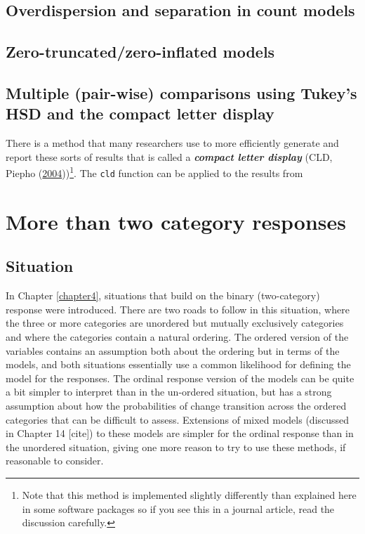 \documentclass[
]{book}
\begin{document}
\hypertarget{section12-6}{%
\section{Overdispersion and separation in count models}\label{section12-6}}

\hypertarget{section12-7}{%
\section{Zero-truncated/zero-inflated models}\label{section12-7}}

\hypertarget{section12-8}{%
\section{Multiple (pair-wise) comparisons using Tukey's HSD and the compact letter display}\label{section12-8}}

\indent There is a method that many researchers use to more efficiently generate and
report these sorts of results that is called a \textbf{\emph{compact letter display}} 
(CLD, Piepho (\protect\hyperlink{ref-Piepho2004}{2004}))\footnote{Note that this method is implemented slightly differently than explained here in some software packages so if you see this in a journal article, read the discussion carefully.}. The \texttt{cld} function can be applied to the results from

\hypertarget{chapter13}{%
\chapter{More than two category responses}\label{chapter13}}

\hypertarget{section13-1}{%
\section{Situation}\label{section13-1}}

In Chapter \ref{chapter4}, situations that build on the binary (two-category) response were introduced. There are two roads to follow in this situation, where the three or more categories are unordered but mutually exclusively categories and where the categories contain a natural ordering. The ordered version of the variables contains an assumption both about the ordering but in terms of the models, and both situations essentially use a common likelihood for defining the model for the responses. The ordinal response version of the models can be quite a bit simpler to interpret than in the un-ordered situation, but has a strong assumption about how the probabilities of change transition across the ordered categories that can be difficult to assess. Extensions of mixed models (discussed in Chapter 14 {[}cite{]}) to these models are simpler for the ordinal response than in the unordered situation, giving one more reason to try to use these methods, if reasonable to consider.
\end{document}
